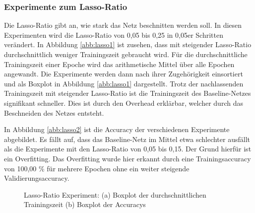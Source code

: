 \subsubsection{Experimente zum Lasso-Ratio}
Die Lasso-Ratio gibt an, wie stark das Netz beschnitten werden soll. In diesen Experimenten wird die Lasso-Ratio von 0,05 bis 0,25 in 0,05er Schritten verändert. In Abbildung \ref{abb:lasso1} ist zusehen, dass mit steigender Lasso-Ratio durchschnittlich weniger Trainingszeit gebraucht wird. Für die durchschnittliche Trainingszeit einer Epoche wird das arithmetische Mittel über alle Epochen angewandt. Die Experimente werden dann nach ihrer Zugehörigkeit einsortiert und als Boxplot in Abbildung \ref{abb:lasso1} dargestellt. Trotz der nachlassenden Trainingszeit mit steigender Lasso-Ratio ist die Trainingszeit des Baseline-Netzes signifikant schneller. Dies ist durch den Overhead erklärbar, welcher durch das Beschneiden des Netzes entsteht.


In Abbildung \ref{abb:lasso2} ist die Accuracy der verschiedenen Experimente abgebildet. Es fällt auf, dass das Baseline-Netz im Mittel etwa schlechter ausfällt als die Experimente mit den Lasso-Ratio von 0,05 bis 0,15. Der Grund hierfür ist ein Overfitting. Das Overfitting wurde hier erkannt durch eine Trainingsaccuracy von 100,00 \% für mehrere Epochen ohne ein weiter steigende Validierungsaccuracy. 
\begin{figure}
     \centering
     \hfill
     \caption{Lasso-Ratio Experiment: (a) Boxplot der durchschnittlichen Trainingszeit (b) Boxplot der Accuracys}
     \label{abb:lasso}
\end{figure}




